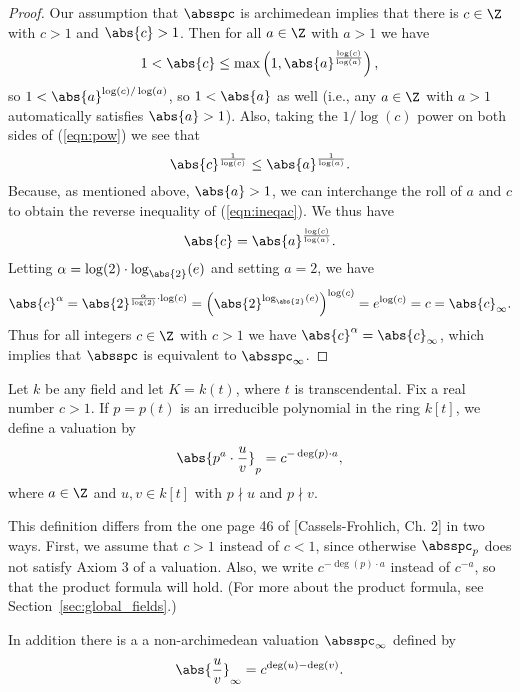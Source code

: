 \begin{proof}
Our assumption that $\absspc$ is archimedean implies
that there is $c\in\Z$ with $c>1$ and $\abs{c}>1$.
Then for all $a\in\Z$ with $a>1$ we have
\begin{equation}\label{eqn:pow}
  1 < \abs{c} \leq
  \max\left(1,\abs{a}^{\frac{\log(c)}{\log(a)}}\right),
\end{equation}
so $1<\abs{a}^{\log(c)/\log(a)}$, so 
$1<\abs{a}$ as well (i.e., any $a\in\Z$ with
$a>1$ automatically satisfies $\abs{a}>1$).  Also, taking the
$1/\log(c)$ power on both sides of (\ref{eqn:pow})
we see that 
\begin{equation}\label{eqn:ineqac}
  \abs{c}^{\frac{1}{\log(c)}}
    \leq   \abs{a}^{\frac{1}{\log(a)}}.
\end{equation}
Because, as mentioned above, $\abs{a}>1$, we can interchange the roll
of $a$ and $c$ to obtain the reverse inequality of (\ref{eqn:ineqac}).
We thus have 
$$
  \abs{c}
    =   \abs{a}^{\frac{\log(c)}{\log(a)}}.
$$ Letting $\alpha=\log(2)\cdot \log_{\abs{2}}(e)$ and setting $a=2$,
we have
$$
  \abs{c}^{\alpha} = \abs{2}^{\frac{\alpha}{\log(2)}\cdot \log(c)}
      = \left(\abs{2}^{\log_{\abs{2}}(e)}\right)^{\log(c)} =
   e^{\log(c)} = c = \abs{c}_\infty.
$$
Thus for all integers $c\in\Z$ with $c>1$ we have
$\abs{c}^{\alpha} = \abs{c}_{\infty}$, which implies
that $\absspc$ is equivalent to $\absspc_\infty$.
\end{proof}

Let $k$ be any field and let $K=k(t)$, where $t$
is transcendental.  Fix a real number $c>1$.
If $p=p(t)$ is an irreducible
polynomial in the ring $k[t]$, we define a valuation
by 
\begin{equation}\label{eqn:ffabsp}
  \abs{p^a \cdot \frac{u}{v}}_p = c^{-\deg(p)\cdot a},
\end{equation}
where $a\in\Z$ and $u,v\in k[t]$ with
$p\nmid u$ and $p\nmid v$.
\begin{remark}
This definition differs from the one page 46 of [Cassels-Frohlich,
Ch. 2] in two ways.   First, we assume that $c>1$ instead
of $c<1$, since otherwise $\absspc_p$ does not satisfy
Axiom 3 of a valuation.  Also, we write $c^{-\deg(p)\cdot a}$
instead of $c^{-a}$, so that the product formula will
hold.  (For more about the product formula, see
Section~\ref{sec:global_fields}.)
\end{remark}
In addition there is a a non-archimedean valuation
$\absspc_\infty$ defined by 
\begin{equation}\label{eqn:ffabsoo}
  \abs{\frac{u}{v}}_\infty = c^{\deg(u)-\deg(v)}.
\end{equation}


